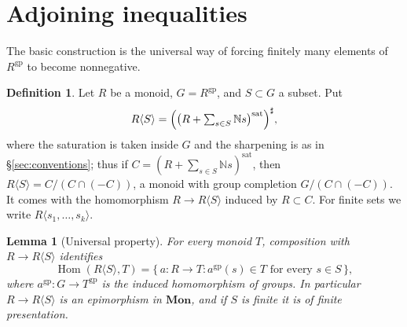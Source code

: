 \documentclass[11pt]{article}
\newcommand{\N}{\mathbb N}
\newcommand{\gp}{\mathrm{gp}}
\newcommand{\sat}{\mathrm{sat}}
\newcommand{\Hom}{\operatorname{Hom}}
\newtheorem{lemma}[theorem]{Lemma}
\theoremstyle{definition}
\newtheorem{definition}[theorem]{Definition}
\theoremstyle{remark}
\begin{document}
\section{Adjoining inequalities}
\label{sec:adjoin}

The basic construction is the universal way of forcing finitely many
elements of \(R^{\gp}\) to become nonnegative.

\begin{definition}\label{def:adjoin}
Let \(R\) be a monoid, \(G=R^{\gp}\), and \(S\subset G\) a subset.  Put
\begin{equation}
 R\langle S\rangle
  =\Bigl(\bigl(R+\textstyle\sum_{s\in S}\N s\bigr)^{\sat}\Bigr)^\sharp ,
 \label{eq:adjoin}
\end{equation}
where the saturation is taken inside \(G\) and the sharpening is as in
\S\ref{sec:conventions}; thus if \(C=(R+\sum_{s\in S}\N s)^{\sat}\), then
\(R\langle S\rangle=C/(C\cap(-C))\), a monoid with group completion
\(G/(C\cap(-C))\).  It comes with the homomorphism
\(R\to R\langle S\rangle\) induced by \(R\subset C\).  For finite sets we
write \(R\langle s_1,\dots,s_k\rangle\).
\end{definition}

\begin{lemma}[Universal property]\label{lem:universal}
For every monoid \(T\), composition with \(R\to R\langle S\rangle\)
identifies
\begin{equation}
 \Hom(R\langle S\rangle,T)
 =
 \{\,a:R\longrightarrow T:
                    a^{\gp}(s)\in T\text{ for every }s\in S\,\},
 \label{eq:universal}
\end{equation}
where \(a^{\gp}:G\to T^{\gp}\) is the induced homomorphism of groups.  In
particular \(R\to R\langle S\rangle\) is an epimorphism in \(\mathbf{Mon}\),
and if \(S\) is finite it is of finite presentation.
\end{lemma}
\end{document}
